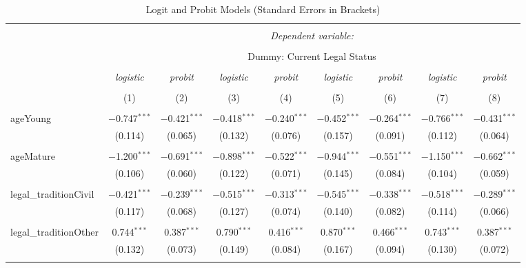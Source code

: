 \documentclass[a4paper,nobind]{templates/ociamthesis}
\begin{document}
\begin{landscape}
\begin{table}[!htbp] \centering 
  \caption{Logit and Probit Models (Standard Errors in Brackets)} 
  \label{} 
\footnotesize 
\begin{tabular}{@{\extracolsep{5pt}}lcccccccc} 
\\[-1.8ex]\hline 
\hline \\[-1.8ex] 
 & \multicolumn{8}{c}{\textit{Dependent variable:}} \\ 
\cline{2-9} 
\\[-1.8ex] & \multicolumn{8}{c}{Dummy: Current Legal Status} \\ 
\\[-1.8ex] & \textit{logistic} & \textit{probit} & \textit{logistic} & \textit{probit} & \textit{logistic} & \textit{probit} & \textit{logistic} & \textit{probit} \\ 
\\[-1.8ex] & (1) & (2) & (3) & (4) & (5) & (6) & (7) & (8)\\ 
\hline \\[-1.8ex] 
 ageYoung & $-$0.747$^{***}$ & $-$0.421$^{***}$ & $-$0.418$^{***}$ & $-$0.240$^{***}$ & $-$0.452$^{***}$ & $-$0.264$^{***}$ & $-$0.766$^{***}$ & $-$0.431$^{***}$ \\ 
  & (0.114) & (0.065) & (0.132) & (0.076) & (0.157) & (0.091) & (0.112) & (0.064) \\ 
  & & & & & & & & \\ 
 ageMature & $-$1.200$^{***}$ & $-$0.691$^{***}$ & $-$0.898$^{***}$ & $-$0.522$^{***}$ & $-$0.944$^{***}$ & $-$0.551$^{***}$ & $-$1.150$^{***}$ & $-$0.662$^{***}$ \\ 
  & (0.106) & (0.060) & (0.122) & (0.071) & (0.145) & (0.084) & (0.104) & (0.059) \\ 
  & & & & & & & & \\ 
 legal\_traditionCivil & $-$0.421$^{***}$ & $-$0.239$^{***}$ & $-$0.515$^{***}$ & $-$0.313$^{***}$ & $-$0.545$^{***}$ & $-$0.338$^{***}$ & $-$0.518$^{***}$ & $-$0.289$^{***}$ \\ 
  & (0.117) & (0.068) & (0.127) & (0.074) & (0.140) & (0.082) & (0.114) & (0.066) \\ 
  & & & & & & & & \\ 
 legal\_traditionOther & 0.744$^{***}$ & 0.387$^{***}$ & 0.790$^{***}$ & 0.416$^{***}$ & 0.870$^{***}$ & 0.466$^{***}$ & 0.743$^{***}$ & 0.387$^{***}$ \\ 
  & (0.132) & (0.073) & (0.149) & (0.084) & (0.167) & (0.094) & (0.130) & (0.072) \\ 
  & & & & & & & & \\ 

\end{tabular}
\end{table}
\end{landscape}
\end{document}
